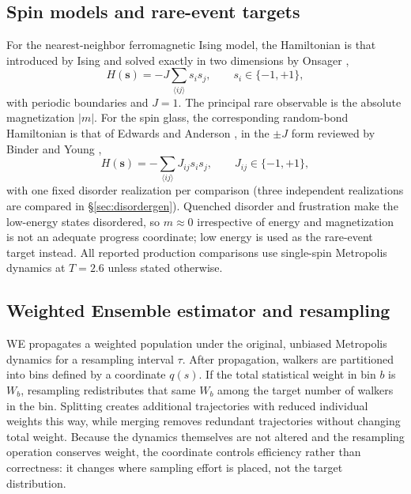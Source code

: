 \documentclass[a4paper,fleqn]{cas-sc}
\begin{document}
\subsection{Spin models and rare-event targets}\label{sec:models}
For the nearest-neighbor ferromagnetic Ising model, the Hamiltonian is that introduced by
Ising \citep{ising1925} and solved exactly in two dimensions by Onsager \citep{onsager1944},
\begin{equation}
H(\mathbf s)=-J\sum_{\langle ij\rangle}s_is_j,\qquad s_i\in\{-1,+1\},
\label{eq:ising}
\end{equation}
with periodic boundaries and $J=1$. The principal rare observable is the absolute
magnetization $|m|$. For the spin glass, the corresponding random-bond Hamiltonian is that of
Edwards and Anderson \citep{edwards1975}, in the $\pm J$ form reviewed by Binder and Young
\citep{binder1986},
\begin{equation}
H(\mathbf s)=-\sum_{\langle ij\rangle}J_{ij}s_is_j,\qquad J_{ij}\in\{-1,+1\},
\label{eq:ea}
\end{equation}
with one fixed disorder realization per comparison (three independent realizations are
compared in \S\ref{sec:disordergen}). Quenched disorder and frustration make the low-energy
states disordered, so $m\approx0$ irrespective of energy and magnetization is not an adequate
progress coordinate; low energy is used as the rare-event target instead. All reported
production comparisons use single-spin Metropolis dynamics \citep{metropolis1953} at $T=2.6$
unless stated otherwise.

\subsection{Weighted Ensemble estimator and resampling}\label{sec:we}
WE propagates a weighted population under the original, unbiased Metropolis dynamics for a
resampling interval $\tau$. After propagation, walkers are partitioned into bins defined by a
coordinate $q(s)$. If the total statistical weight in bin $b$ is $W_b$, resampling
redistributes that same $W_b$ among the target number of walkers in the bin. Splitting creates
additional trajectories with reduced individual weights this way, while merging removes
redundant trajectories without changing total weight. Because the dynamics themselves are not
altered and the resampling operation conserves weight, the coordinate controls efficiency
rather than correctness: it changes where sampling effort is placed, not the target
distribution.
\end{document}
